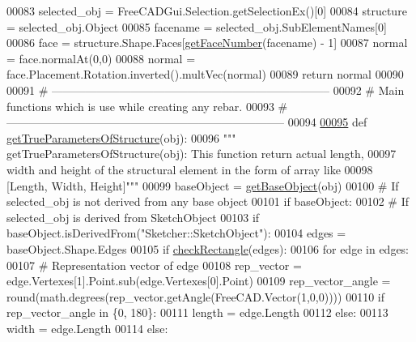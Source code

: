 \begin{DoxyCode}
00083         selected\_obj = FreeCADGui.Selection.getSelectionEx()[0]
00084         structure = selected\_obj.Object
00085         facename = selected\_obj.SubElementNames[0]
00086     face = structure.Shape.Faces[\hyperlink{namespaceRebarfunc_a3885b3b63e3a41508ac79bc7550cf301}{getFaceNumber}(facename) - 1]
00087     normal = face.normalAt(0,0)
00088     normal = face.Placement.Rotation.inverted().multVec(normal)
00089     \textcolor{keywordflow}{return} normal
00090 
00091 \textcolor{comment}{# --------------------------------------------------------------------------}
00092 \textcolor{comment}{# Main functions which is use while creating any rebar.}
00093 \textcolor{comment}{# --------------------------------------------------------------------------}
00094 
\hypertarget{Rebarfunc_8py_source.tex_l00095}{}\hyperlink{namespaceRebarfunc_a56b5187c8b2c8bf1b14b4fc88eb6d54c}{00095} \textcolor{keyword}{def }\hyperlink{namespaceRebarfunc_a56b5187c8b2c8bf1b14b4fc88eb6d54c}{getTrueParametersOfStructure}(obj):
00096     \textcolor{stringliteral}{""" getTrueParametersOfStructure(obj): This function return actual length,}
00097 \textcolor{stringliteral}{    width and height of the structural element in the form of array like}
00098 \textcolor{stringliteral}{    [Length, Width, Height]"""}
00099     baseObject = \hyperlink{namespaceRebarfunc_a7169bcadefe75626e6cfb7549b1deb4b}{getBaseObject}(obj)
00100     \textcolor{comment}{# If selected\_obj is not derived from any base object}
00101     \textcolor{keywordflow}{if} baseObject:
00102         \textcolor{comment}{# If selected\_obj is derived from SketchObject}
00103         \textcolor{keywordflow}{if} baseObject.isDerivedFrom(\textcolor{stringliteral}{"Sketcher::SketchObject"}):
00104             edges = baseObject.Shape.Edges
00105             \textcolor{keywordflow}{if} \hyperlink{namespaceRebarfunc_a24ab60160ea54e86c0ce1b727621bf71}{checkRectangle}(edges):
00106                 \textcolor{keywordflow}{for} edge \textcolor{keywordflow}{in} edges:
00107                     \textcolor{comment}{# Representation vector of edge}
00108                     rep\_vector = edge.Vertexes[1].Point.sub(edge.Vertexes[0].Point)
00109                     rep\_vector\_angle = round(math.degrees(rep\_vector.getAngle(FreeCAD.Vector(1,0,0))))
00110                     \textcolor{keywordflow}{if} rep\_vector\_angle \textcolor{keywordflow}{in} \{0, 180\}:
00111                         length = edge.Length
00112                     \textcolor{keywordflow}{else}:
00113                         width = edge.Length
00114             \textcolor{keywordflow}{else}:

\end{DoxyCode}
